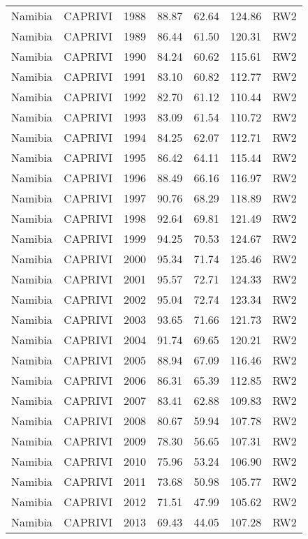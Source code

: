\begin{longtable}{lllrrrl}
  Namibia & CAPRIVI & 1988 & 88.87 & 62.64 & 124.86 & RW2 \\ 
  Namibia & CAPRIVI & 1989 & 86.44 & 61.50 & 120.31 & RW2 \\ 
  Namibia & CAPRIVI & 1990 & 84.24 & 60.62 & 115.61 & RW2 \\ 
  Namibia & CAPRIVI & 1991 & 83.10 & 60.82 & 112.77 & RW2 \\ 
  Namibia & CAPRIVI & 1992 & 82.70 & 61.12 & 110.44 & RW2 \\ 
  Namibia & CAPRIVI & 1993 & 83.09 & 61.54 & 110.72 & RW2 \\ 
  Namibia & CAPRIVI & 1994 & 84.25 & 62.07 & 112.71 & RW2 \\ 
  Namibia & CAPRIVI & 1995 & 86.42 & 64.11 & 115.44 & RW2 \\ 
  Namibia & CAPRIVI & 1996 & 88.49 & 66.16 & 116.97 & RW2 \\ 
  Namibia & CAPRIVI & 1997 & 90.76 & 68.29 & 118.89 & RW2 \\ 
  Namibia & CAPRIVI & 1998 & 92.64 & 69.81 & 121.49 & RW2 \\ 
  Namibia & CAPRIVI & 1999 & 94.25 & 70.53 & 124.67 & RW2 \\ 
  Namibia & CAPRIVI & 2000 & 95.34 & 71.74 & 125.46 & RW2 \\ 
  Namibia & CAPRIVI & 2001 & 95.57 & 72.71 & 124.33 & RW2 \\ 
  Namibia & CAPRIVI & 2002 & 95.04 & 72.74 & 123.34 & RW2 \\ 
  Namibia & CAPRIVI & 2003 & 93.65 & 71.66 & 121.73 & RW2 \\ 
  Namibia & CAPRIVI & 2004 & 91.74 & 69.65 & 120.21 & RW2 \\ 
  Namibia & CAPRIVI & 2005 & 88.94 & 67.09 & 116.46 & RW2 \\ 
  Namibia & CAPRIVI & 2006 & 86.31 & 65.39 & 112.85 & RW2 \\ 
  Namibia & CAPRIVI & 2007 & 83.41 & 62.88 & 109.83 & RW2 \\ 
  Namibia & CAPRIVI & 2008 & 80.67 & 59.94 & 107.78 & RW2 \\ 
  Namibia & CAPRIVI & 2009 & 78.30 & 56.65 & 107.31 & RW2 \\ 
  Namibia & CAPRIVI & 2010 & 75.96 & 53.24 & 106.90 & RW2 \\ 
  Namibia & CAPRIVI & 2011 & 73.68 & 50.98 & 105.77 & RW2 \\ 
  Namibia & CAPRIVI & 2012 & 71.51 & 47.99 & 105.62 & RW2 \\ 
  Namibia & CAPRIVI & 2013 & 69.43 & 44.05 & 107.28 & RW2 \\ 

\end{longtable}
